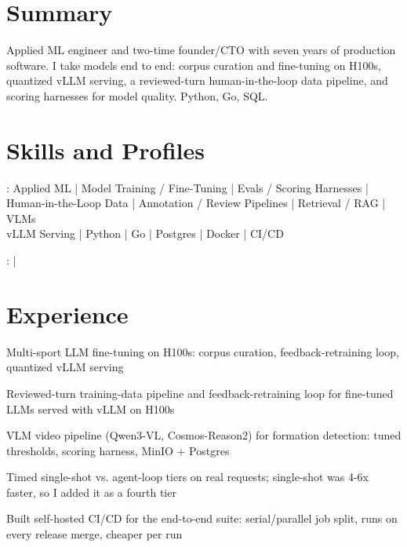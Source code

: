 \documentclass[print]{jack-resume}
\begin{document}
\pagecolor{darkmodeBackground}


\begin{minipage}[t][1cm][t]{.03\textwidth}
    \hfill
\end{minipage}

\section{Summary}
Applied ML engineer and two-time founder/CTO with seven years of production software. I take models end to end: corpus curation and fine-tuning on H100s, quantized vLLM serving, a reviewed-turn human-in-the-loop data pipeline, and scoring harnesses for model quality. Python, Go, SQL.
\sectionsep

\section{Skills and Profiles}
:
Applied ML \hfill | \hfill
Model Training / Fine-Tuning \hfill | \hfill
Evals / Scoring Harnesses \hfill | \hfill
Human-in-the-Loop Data \hfill | \hfill
Annotation / Review Pipelines \hfill | \hfill
Retrieval / RAG \hfill | \hfill
VLMs \\
\hspace{1.0cm} vLLM Serving \hfill | \hfill
Python \hfill | \hfill
Go \hfill | \hfill
Postgres \hfill | \hfill
Docker \hfill | \hfill
CI/CD \\

\raggedright{
    :
      \href{https://www.linkedin.com/in/jack-sturtevant/}{ \ExternalLink} |
     \href{https://github.com/jacksturt}{ \ExternalLink}}

\section{Experience}

\begin{tightemize}
    \item Multi-sport LLM fine-tuning on H100s: corpus curation, feedback-retraining loop, quantized vLLM serving
    \item Reviewed-turn training-data pipeline and feedback-retraining loop for fine-tuned LLMs served with vLLM on H100s
    \item VLM video pipeline (Qwen3-VL, Cosmos-Reason2) for formation detection: tuned thresholds, scoring harness, MinIO + Postgres
    \item Timed single-shot vs. agent-loop tiers on real requests; single-shot was 4-6x faster, so I added it as a fourth tier
    \item Built self-hosted CI/CD for the end-to-end suite: serial/parallel job split, runs on every release merge, cheaper per run
\end{tightemize}
\sectionsep
\end{document}

